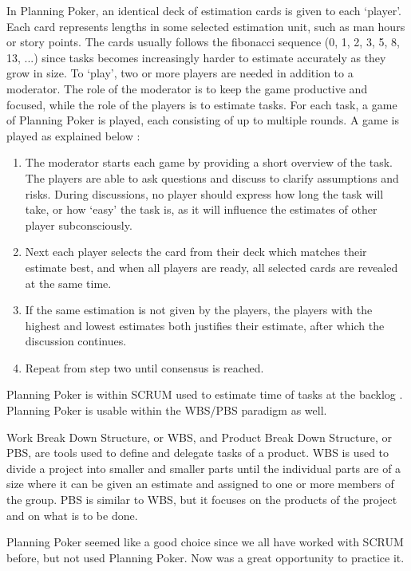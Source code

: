 In Planning Poker, an identical deck of estimation cards is given to each `player'. Each card represents lengths in some selected estimation unit, such as man hours or story points. The cards usually follows the fibonacci sequence (0, 1, 2, 3, 5, 8, 13, ...) since tasks becomes increasingly harder to estimate accurately as they grow in size.
To `play', two or more players are needed in addition to a moderator. The role of the moderator is to keep the game productive and focused, while the role of the players is to estimate tasks.
For each task, a game of Planning Poker is played, each consisting of up to multiple rounds. A game is played as explained below \cite[p. 57]{aep}:
\begin{enumerate}
	\item The moderator starts each game by providing a short overview of the task. The players are able to ask questions and discuss to clarify assumptions and risks. During discussions, no player should express how long the task will take, or how `easy' the task is, as it will influence the estimates of other player subconsciously.
	\item Next each player selects the card from their deck which matches their estimate best, and when all players are ready, all selected cards are revealed at the same time.
	\item If the same estimation is not given by the players, the players with the highest and lowest estimates both justifies their estimate, after which the discussion continues.
	\item Repeat from step two until consensus is reached.
\end{enumerate}

Planning Poker is within SCRUM used to estimate time of tasks at the backlog \cite[p. 56]{aep}. Planning Poker is usable within the WBS/PBS paradigm as well.

Work Break Down Structure, or WBS, and Product Break Down Structure, or PBS, are tools used to define and delegate tasks of a product. WBS is used to divide a project into smaller and smaller parts until the individual parts are of a size where it can be given an estimate and assigned to one or more members of the group\cite[p. 117]{PM}. PBS is similar to WBS, but it focuses on the products of the project and on what is to be done\cite[p. 119]{PM}.

Planning Poker seemed like a good choice since we all have worked with SCRUM before, but not used Planning Poker. Now was a great opportunity to practice it.

